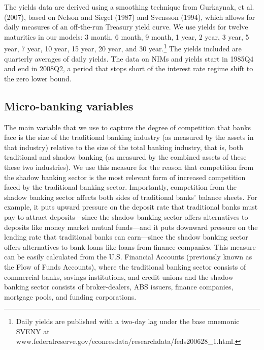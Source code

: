 \documentclass[11pt]{article}
\renewcommand{\baselinestretch}{1.5}
\begin{document}
The yields data are derived using a smoothing technique from Gurkaynak, et al. (2007), based on Nelson and Siegel (1987) and Svensson (1994), which allows for daily measures of an off-the-run Treasury yield curve. We use yields for twelve maturities in our models: 3 month, 6 month, 9 month, 1 year, 2 year, 3 year, 5 year, 7 year, 10 year, 15 year, 20 year, and 30 year.\renewcommand{\baselinestretch}{1}\footnote{Daily yields are published with a two-day lag under the base mnemonic SVENY at  www.federalreserve.gov/econresdata/researchdata/feds200628\_1.html.\vspace{0.05in}}\renewcommand{\baselinestretch}{1.5} The yields included are quarterly averages of daily yields.  The data on NIMs and yields start in 1985Q4 and end in 2008Q2, a period that stops short of the interest rate regime shift to the zero lower bound.

\subsection{Micro-banking variables}

\vspace{-0.1in} The main variable that we use to capture the degree of competition that banks face is the size of the traditional
banking industry (as measured by the assets in that industry) relative to the size of the total banking industry, that is, both
traditional and shadow banking (as measured by the combined assets of these these two industries). We use this measure for the
reason that competition from the shadow banking sector is the most relevant form of increased competition faced by the
traditional banking sector.  Importantly, competition from the shadow banking sector affects both sides of traditional banks'
balance sheets. For example, it puts upward pressure on the deposit rate that traditional banks must pay to attract deposits---since the shadow banking sector offers alternatives to deposits like money market mutual funds---and it puts downward pressure on the lending rate that traditional banks can earn---since the shadow banking sector offers alternatives to bank loans like loans from finance companies. This measure can be easily calculated from the U.S. Financial Accounts (previously known as the Flow of Funds Accounts), where the traditional banking sector consists of commercial banks, savings institutions, and credit unions and the shadow banking sector consists of broker-dealers, ABS issuers, finance companies, mortgage pools, and funding corporations.
\end{document}
